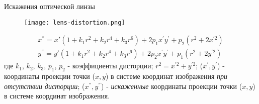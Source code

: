 
\begin{frame}{Искажения оптической линзы}
\begin{figure}
\centering
\texttt{[image: lens-distortion.png]}
\end{figure}
\begin{equation*}
    \label{eq:lens-distortion}
    \begin{split}
        x^{''} = x'(1+k_1r^2 + k_2r^4 + k_3r^6) + 2p_1x^{'}y^{'} + p_2(r^2 + 2x^{'2}) \\ 
        y^{''} = y'(1+k_1r^2 + k_2r^4 + k_3r^6) + 2p_2x^{'}y^{'} + p_1(r^2 + 2y^{'2})
    \end{split}
\end{equation*}
где $k_1$, $k_2$, $k_3$, $p_1$, $p_2$ - коэффициенты дисторции; $r^2 = x^{'2} + y^{'2}$; ($x^{'}, y^{'}$) - координаты проекции точки ($x, y$) в системе координат изображения \textit{при отсутствии дисторции}; ($x^{''}, y^{''}$) - \textit{искаженные} координаты проекции точки ($x, y$) в системе координат изображения.
\end{frame}